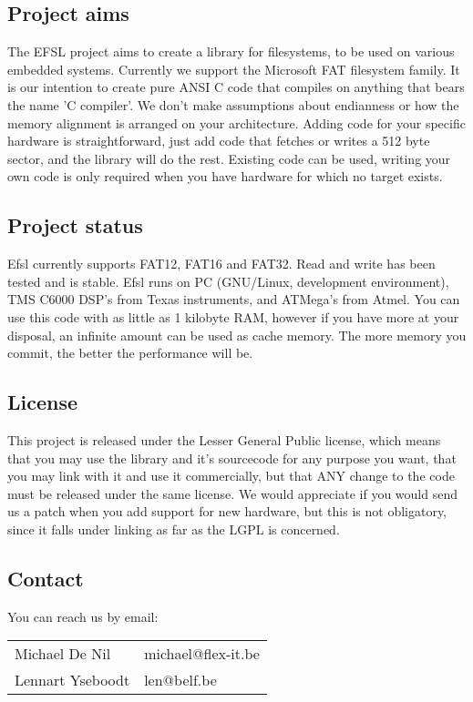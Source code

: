 \subsection{Project aims}
The EFSL project aims to create a library for filesystems, to be used on 
various embedded systems. Currently we support the Microsoft FAT filesystem 
family. It is our intention to create pure ANSI C code that compiles on 
anything that bears the name 'C compiler'. We don't make assumptions about 
endianness or how the memory alignment is arranged on your architecture.
\newline\newline
Adding code for your specific hardware is straightforward, just add code that 
fetches or writes a 512 byte sector, and the library will do the rest. 
Existing code can be used, writing your own code is only required when you 
have hardware for which no target exists.
\subsection{Project status}
Efsl currently supports FAT12, FAT16 and FAT32. Read and write has been tested 
and is stable. Efsl runs on PC (GNU/Linux, development environment), 
TMS C6000 DSP's from Texas instruments, and ATMega's from Atmel.
You can use this code with as little as 1 kilobyte RAM, however if you have 
more at your disposal, an infinite amount can be used as cache memory. 
The more memory you commit, the better the performance will be.
\subsection{License}
This project is released under the Lesser General Public license, which 
means that you may use the library and it's sourcecode for any purpose you want, 
that you may link with it and use it commercially, but that ANY change to the 
code must be released under the same license. We would appreciate if you would  send
us a patch when you add support for new hardware, but this is not obligatory, since it
falls under linking as far as the LGPL is concerned.
\subsection{Contact}
You can reach us by email:\\
\begin{tabular}{ll}
    Michael De Nil & michael@flex-it.be\\
    Lennart Yseboodt & len@belf.be\\
\end{tabular}